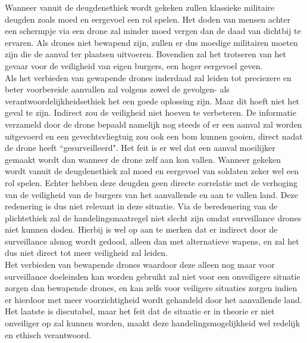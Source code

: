 Wanneer vanuit de deugdenethiek wordt gekeken zullen klassieke militaire deugden zoals moed en eergevoel een rol spelen. Het doden van mensen achter een schermpje via een drone zal minder moed vergen dan de daad van dichtbij te ervaren. Als drones niet bewapend zijn, zullen er dus moedige militairen moeten zijn die de aanval ter plaatsen uitvoeren. Bovendien zal het trotseren van het gevaar voor de veiligheid van eigen burgers, een hoger eergevoel geven.\\

Als het verbieden van gewapende drones inderdaad zal leiden tot preciezere en beter voorbereide aanvallen zal volgens zowel de gevolgen- als verantwoordelijkheidsethiek het een goede oplossing zijn. Maar dit hoeft niet het geval te zijn. Indirect zou de veiligheid niet hoeven te verbeteren. De informatie verzameld door de drone bepaald namelijk nog steeds of er een aanval zal worden uitgevoerd en een gevechtsvliegtuig zou ook een bom kunnen gooien, direct nadat de drone heeft ``gesurveilleerd". Het feit is er wel dat een aanval moeilijker gemaakt wordt dan wanneer de drone zelf aan kon vallen. Wanneer gekeken wordt vanuit de deugdenethiek zal moed en eergevoel van soldaten zeker wel een rol spelen. Echter hebben deze deugden geen directe correlatie met de verhoging van de veiligheid van de burgers van het aanvallende en aan te vallen land. Deze redenering is dus niet relevant in deze situatie. Via de beredenering van de plichtethiek zal de handelingsmaatregel niet slecht zijn omdat surveillance drones niet kunnen doden. Hierbij is wel op aan te merken dat er indirect door de surveillance alsnog wordt gedood, alleen dan met alternatieve wapens, en zal het dus niet direct tot meer veiligheid zal leiden.\\

Het verbieden van bewapende drones waardoor deze alleen nog maar voor surveillance doeleinden kan worden gebruikt zal niet voor een onveiligere situatie zorgen dan bewapende drones, en kan zelfs voor veiligere situaties zorgen indien er hierdoor met meer voorzichtigheid wordt gehandeld door het aanvallende land. Het laatste is discutabel, maar het feit dat de situatie er in theorie er niet onveiliger op zal kunnen worden, maakt deze handelingsmogelijkheid wel redelijk en ethisch verantwoord. 

